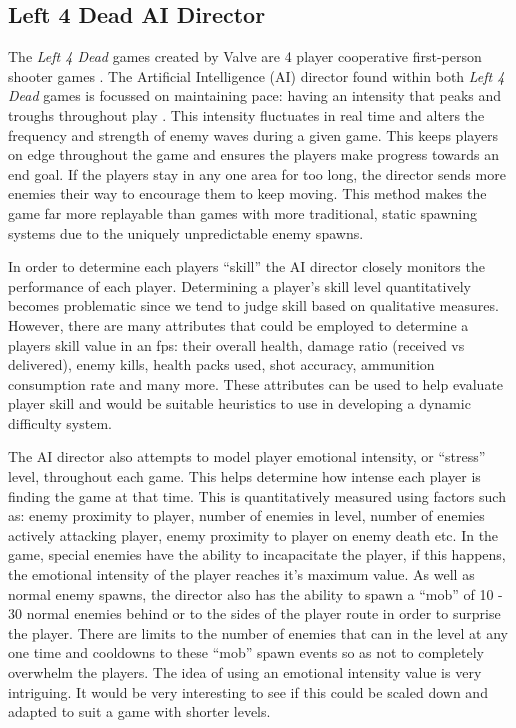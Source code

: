 \documentclass[journal]{IEEEtran}
\begin{document}
\subsection{Left 4 Dead AI Director}
The \textit{Left 4 Dead} games created by Valve are 4 player cooperative first-person shooter games \cite{game:left4dead} \cite{game:left4dead2}. The Artificial Intelligence (AI) director found within both \textit{Left 4 Dead} games is focussed on maintaining pace: having an intensity that peaks and troughs throughout play \cite{booth2009ai}. This intensity fluctuates in real time and alters the frequency and strength of enemy waves during a given game. This keeps players on edge throughout the game and ensures the players make progress towards an end goal. If the players stay in any one area for too long, the director sends more enemies their way to encourage them to keep moving. This method makes the game far more replayable than games with more traditional, static spawning systems due to the uniquely unpredictable enemy spawns.

In order to determine each players ``skill'' the AI director closely monitors the performance of each player. Determining a player's skill level quantitatively becomes problematic since we tend to judge skill based on qualitative measures. However, there are many attributes that could be employed to determine a players skill value in an fps: their overall health, damage ratio (received vs delivered), enemy kills, health packs used, shot accuracy, ammunition consumption rate and many more. These attributes can be used to help evaluate player skill and would be suitable heuristics to use in developing a dynamic difficulty system.

The AI director also attempts to model player emotional intensity, or ``stress'' level, throughout each game. This helps determine how intense each player is finding the game at that time. This is quantitatively measured using factors such as: enemy proximity to player, number of enemies in level, number of enemies actively attacking player, enemy proximity to player on enemy death etc. In the game, special enemies have the ability to incapacitate the player, if this happens, the emotional intensity of the player reaches it's maximum value. As well as normal enemy spawns, the director also has the ability to spawn a ``mob'' of 10 - 30 normal enemies behind or to the sides of the player route in order to surprise the player. There are limits to the number of enemies that can in the level at any one time and cooldowns to these ``mob'' spawn events so as not to completely overwhelm the players. The idea of using an emotional intensity value is very intriguing. It would be very interesting to see if this could be scaled down and adapted to suit a game with shorter levels. 
\end{document}
